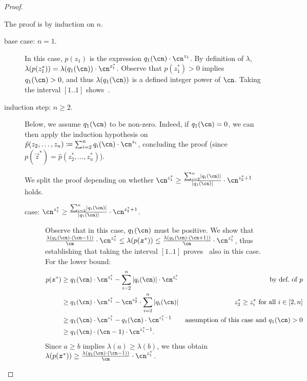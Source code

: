 \begin{proof}
    \begin{claimproof}
      The proof is by induction on $n$.
      \begin{description}
        \item[base case: $n = 1$.]
          In this case, $p(z_1)$ is the expression $q_1(\cn) \cdot \cn^{z_1}$. By
          definition of $\lambda$, $\lambda(p(z_1^*)) = \lambda(q_1(\cn)) \cdot
            \cn^{z_1^*}$. Observe that $p(z_1^*) > 0$ implies $q_1(\cn) > 0$, and
          thus
          $\lambda(q_1(\cn))$ is a defined integer power of $\cn$. Taking the
          interval $[1..1]$ shows~.
        \item[induction step: $n \geq 2$.]
          Below, we assume $q_1(\cn)$ to be non-zero.
          Indeed, if $q_1(\cn) = 0$,
          we can then apply the induction hypothesis on
          $\hat{p}(z_2,\dots,z_n) \coloneqq \sum_{i=2}^n q_i(\cn) \cdot
            \cn^{z_i}$,
          concluding the proof (since $p(\vec z^*) =
            \hat{p}(z_2^*,\dots,z_n^*)$).
  
          We split the proof depending on whether $\cn^{z_1^*} \geq
            \frac{\sum_{i=2}^n \abs{q_i(\cn)}}{\abs{q_1(\cn)}} \cdot
            \cn^{z_2^*+1}$ holds.
          \begin{description}
            \item[case: $\cn^{z_1^*} \geq \frac{\sum_{i=2}^n
            \abs{q_i(\cn)}}{\abs{q_1(\cn)}} \cdot \cn^{z_2^*+1}$.]
              Observe that in this case, $q_1(\cn)$ must be positive. We show
              that
              $\frac{\lambda(q_1(\cn) \cdot (\cn-1))}{\cn} \cdot \cn^{z_1^*} \leq
                \lambda(p(\vec{z}^*)) \leq \frac{\lambda(q_1(\cn) \cdot (\cn+1))}{\cn}
                \cdot \cn^{z_1^*}$,
              thus establishing that taking the interval $[1..1]$
              proves~ also in this case.
              For the lower bound:
              \begin{align*}
                p(\vec z^*) & \geq q_1(\cn) \cdot \cn^{z_1^*} - \sum_{i=2}^n
                \abs{q_i(\cn)} \cdot \cn^{z_i^*}
                            & \text{by def.~of~$p$}
                \\
                            & \geq q_1(\cn) \cdot \cn^{z_1^*} - \cn^{z_2^*}\cdot
                \sum_{i=2}^n
                \abs{q_i(\cn)}
                            & z_2^* \geq z_i^* \text{ for all $i \in [2,n]$}
                \\
                            & \geq
                q_1(\cn) \cdot \cn^{z_1^*} - q_1(\cn) \cdot \cn^{z_1^*-1}
                            & \text{assumption of this case and $q_1(\cn) > 0$}
                \\
                            & \geq
                q_1(\cn) \cdot (\cn - 1) \cdot \cn^{z_1^*-1}.
              \end{align*}
              Since $a \geq b$ implies $\lambda(a) \geq \lambda(b)$, we thus
              obtain
              $\lambda(p(\vec z^*)) \geq \frac{\lambda(q_1(\cn) \cdot
                  (\cn-1))}{\cn} \cdot
                \cn^{z_1^*}$.
  

\end{description}
\end{description}
\end{claimproof}
\end{proof}
